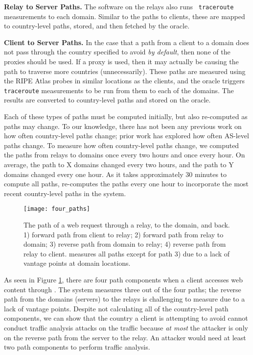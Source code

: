 {\bf Relay to Server Paths.} The software on the relays also runs {\tt 
traceroute} measurements to each domain.  Similar to the paths to clients, these 
are mapped to country-level paths, stored, and then fetched by the oracle.

{\bf Client to Server Paths.} In the case that a path from a client to a 
domain does not pass through the country specified to avoid {\it by default}, 
then none of the proxies should be used.  If a proxy is used, then it may 
actually be causing the path to traverse more countries (unnecessarily).  These 
paths are measured using the RIPE Atlas probes in similar locations as the 
clients, and the oracle triggers {\tt traceroute} measurements to be run from 
them to each of the domains.  The results are converted to country-level paths 
and stored on the oracle.  

Each of these types of paths must be computed initially, but also re-computed 
as paths may change.  To our knowledge, there has not been any previous work 
on how often country-level paths change; prior work has explored how often 
AS-level paths change.  To measure how often country-level paths change, we 
computed the paths from relays to domains once every two hours and once every 
hour.  On average, the path to X domains changed every two hours, and the path 
to Y domains changed every one hour.  As it takes approximately 30 minutes to 
compute all paths, \system{} re-computes the paths every one hour to incorporate 
the most recent country-level paths in the system.

\begin{figure}[t]
\centering
\texttt{[image: four\_paths]}
\caption{The path of a web request through a \system{} relay, to the domain, and back. 
1) forward path from client to relay; 2) forward path from relay to domain; 3) reverse 
path from domain to relay; 4) reverse path from relay to client.  \system{} measures 
all paths except for path 3) due to a lack of vantage points at domain locations.}
\label{fig:path_components}
\end{figure}

As seen in Figure \ref{fig:path_components}, there are four path components 
when a client accesses web content through \system{}.  The system measures three 
out of the four paths; the reverse path from the domains (servers) to the relays 
is challenging to measure due to a lack of vantage points.  Despite not 
calculating all of the country-level path components, we can show that the 
country a client is attempting to avoid cannot conduct traffic analysis attacks 
on the traffic because {\it at most} the attacker is only on the reverse path 
from the server to the relay.  An attacker would need at least two path 
components to perform traffic analysis. 

